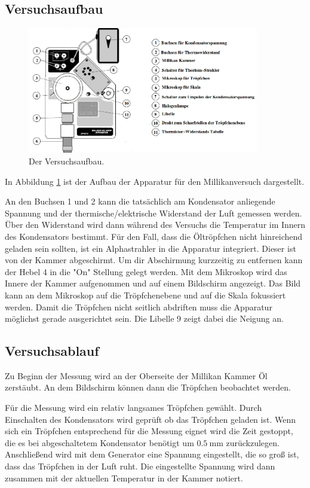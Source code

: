 \documentclass[
  bibliography=totoc,     %
  captions=tableheading,  %
  titlepage=firstiscover, %
]{scrartcl}
\begin{document}
\subsection{Versuchsaufbau}
\begin{figure}[htb]
  \centering
  \includegraphics[width=0.9\textwidth]{5031.png}
  \caption{Der Versuchsaufbau. \cite{anleitung}}
  \label{fig:5031}
\end{figure}
In Abbildung \ref{fig:5031} ist der Aufbau der Apparatur für den Millikanversuch
dargestellt.

\noindent
An den Buchsen 1 und 2 kann die tatsächlich am Kondensator anliegende Spannung
und der thermische/elektrische Widerstand der Luft gemessen werden.
Über den Widerstand wird dann während des Versuchs die Temperatur im Innern des
Kondensators bestimmt. Für den Fall, dass die Öltröpfchen nicht hinreichend geladen sein sollten,
ist ein Alphastrahler in die Apparatur integriert. Dieser ist von der Kammer abgeschirmt.
Um dir Abschirmung kurzzeitig zu entfernen kann der Hebel 4 in die "On" Stellung
gelegt werden. Mit dem Mikroskop wird das Innere der Kammer aufgenommen und auf
einem Bildschirm angezeigt. Das Bild kann an dem Mikroskop auf die Tröpfchenebene
und auf die Skala fokussiert werden. Damit die Tröpfchen nicht seitlich abdriften
muss die Apparatur möglichst gerade ausgerichtet sein. Die Libelle 9 zeigt dabei
die Neigung an.
\subsection{Versuchsablauf}
Zu Beginn der Messung wird an der Oberseite der Millikan Kammer Öl zerstäubt.
An dem Bildschirm können dann die Tröpfchen beobachtet werden.

\noindent
Für die Messung wird ein relativ langsames Tröpfchen gewählt.
Durch Einschalten des Kondensators wird geprüft ob das Tröpfchen
geladen ist. Wenn sich ein Tröpfchen entsprechend für die Messung
eignet wird die Zeit gestoppt, die es bei abgeschaltetem Kondensator
benötigt um $\SI{0.5}{\milli\meter}$ zurückzulegen. Anschließend wird
mit dem Generator eine Spannung eingestellt, die so groß ist, dass das
Tröpfchen in der Luft ruht. Die eingestellte Spannung wird dann zusammen
mit der aktuellen Temperatur in der Kammer notiert.
\end{document}
